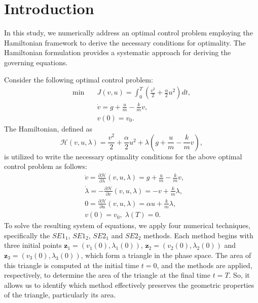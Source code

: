 \documentclass[a4paper, 10pt]{article}
\newcommand{\SEoo}{SE1_1}
\newcommand{\SEot}{SE1_2}
\newcommand{\SEto}{SE2_1}
\newcommand{\SEtt}{SE2_2}
\begin{document}
\section{Introduction}
In this study, we numerically address an optimal control problem employing the Hamiltonian framework to derive the necessary conditions for optimality. The Hamiltonian formulation provides a systematic approach for deriving the governing equations.

Consider the following optimal control problem:
\begin{equation}
    \begin{aligned}
       \min \quad & J(v,u) = \int_{0}^{T} \left( \frac{v^2}{2} + \frac{\alpha}{2}u^2 \right) dt, \\
        & \dot{v} = g + \frac{u}{m} - \frac{k}{m}v, \\
       & v(0) = v_{0}.
    \end{aligned}
    \label{eq:optimal_problem}
\end{equation}
The Hamiltonian, defined as
\[
\mathcal{H}(v,u,\lambda)  = \frac{v^2}{2} + \frac{\alpha}{2}u^2 + \lambda \left( g + \frac{u}{m} - \frac{k}{m}v \right),
\]
is utilized to write the necessary optimality conditions for the above optimal control problem as follows:
\begin{equation}
    \begin{aligned}
       & \dot{v} = \frac{\partial \mathcal{H}}{\partial \lambda} (v,u,\lambda) =  g + \frac{u}{m} - \frac{k}{m}v, \\
       & \dot{\lambda} = - \frac{\partial \mathcal{H}}{\partial v} (v,u,\lambda) = -v + \frac{k}{m} \lambda, \\
       & 0 =  \frac{\partial \mathcal{H}}{\partial u} (v,u,\lambda) = \alpha u + \frac{k}{m}\lambda, \\
       & v(0) = v_{0}, \; \lambda(T) = 0.
    \end{aligned}
    \label{eq:necessary_coditions}
\end{equation}
To solve the resulting system of equations, we apply four numerical techniques, specifically the $\SEoo$, $\SEot$, $\SEto$ and $\SEtt$ methods. Each method begins with three initial points $\mathbf{z}_1 = (v_1(0),\lambda_1(0))$, $\mathbf{z}_2 =(v_2(0),\lambda_2(0))$ and $\mathbf{z}_3 = (v_3(0),\lambda_3(0))$, which form a triangle in the phase space. The area of this triangle is computed at the initial time $t = 0$, and the methods are applied, respectively, to determine the area of the triangle at the final time $t = T$. So, it allows us to identify which method effectively preserves the geometric properties of the triangle, particularly its area.
\end{document}
